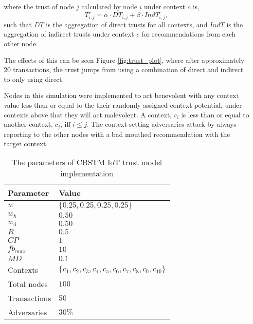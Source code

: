 \documentclass{article}
\begin{document}
    where the trust of node $j$ calculated by node $i$ under context $c$ is,
    \begin{equation}
        T_{i,j}^c = \alpha \cdot DT_{i,j} + \beta \cdot IndT_{i,j}^c,
    \end{equation}
    such that $DT$ is the aggregation of direct trusts for all contexts, and
    $IndT$ is the aggregation of indirect trusts under context $c$ for recommendations
    from each other node.

    The effects of this can be seen Figure \ref{fig:trust_plot}, where after approximately 20
    transactions, the trust jumps from using a combination of direct and indirect to
    only using direct.

    Nodes in this simulation were implemented to act benevolent with any context
    value less than or equal to the their randomly assigned context potential,
    under contexts above that they will act malevolent. A context, $c_i$ is less than or
    equal to another context, $c_j$, iff $i \leq j$. The context setting
    adversaries attack by always reporting to the other nodes with a bad
    mouthed recommendation with the target context.

    \begin{table}
        \begin{tabularx}{\textwidth}{X X}
            \toprule
            \textbf{Parameter} & \textbf{Value} \\
            \midrule
            $w$ & $\{0.25, 0.25, 0.25, 0.25\}$ \\
            \midrule
            $w_h$ & $0.50$ \\
            \midrule
            $w_d$ & $0.50$ \\
            \midrule
            $R$ & $0.5$ \\
            \midrule
            $CP$ & $1$ \\
            \midrule
            $fb_{max}$ & $10$ \\
            \midrule
            $MD$ & $0.1$ \\
            \midrule
            Contexts & $\{c_1, c_2, c_3, c_4, c_5, c_6, c_7, c_8, c_9, c_{10}\}$ \\
            \midrule
            Total nodes & $ 100 $ \\
            \midrule
            Transactions & $ 50 $ \\
            \midrule
            Adversaries & $ 30\% $ \\
            \bottomrule
        \end{tabularx}
        \caption{The parameters of CBSTM IoT trust model implementation}
        \label{table:sim-params}
    \end{table}
\end{document}

